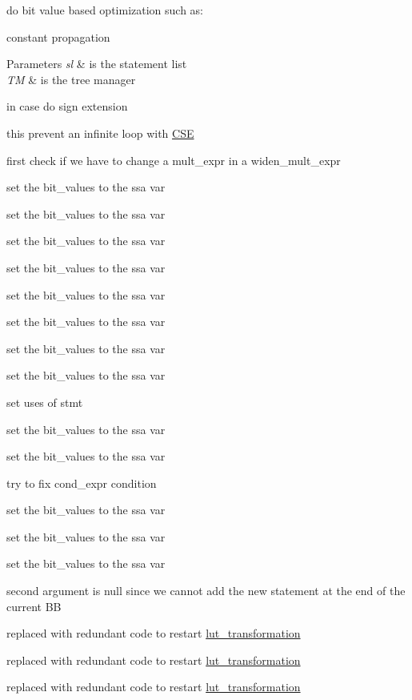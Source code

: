 do bit value based optimization such as\+: 


\begin{DoxyItemize}
\item constant propagation 
\begin{DoxyParams}{Parameters}
{\em sl} & is the statement list \\
\hline
{\em TM} & is the tree manager \\
\hline
\end{DoxyParams}

\end{DoxyItemize}in case do sign extension

this prevent an infinite loop with \hyperlink{classCSE}{C\+SE}

first check if we have to change a mult\+\_\+expr in a widen\+\_\+mult\+\_\+expr

set the bit\+\_\+values to the ssa var

set the bit\+\_\+values to the ssa var

set the bit\+\_\+values to the ssa var

set the bit\+\_\+values to the ssa var

set the bit\+\_\+values to the ssa var

set the bit\+\_\+values to the ssa var

set the bit\+\_\+values to the ssa var

set the bit\+\_\+values to the ssa var

set uses of stmt

set the bit\+\_\+values to the ssa var

set the bit\+\_\+values to the ssa var

try to fix cond\+\_\+expr condition

set the bit\+\_\+values to the ssa var

set the bit\+\_\+values to the ssa var

set the bit\+\_\+values to the ssa var

second argument is null since we cannot add the new statement at the end of the current BB

replaced with redundant code to restart \hyperlink{classlut__transformation}{lut\+\_\+transformation}

replaced with redundant code to restart \hyperlink{classlut__transformation}{lut\+\_\+transformation}

replaced with redundant code to restart \hyperlink{classlut__transformation}{lut\+\_\+transformation}

